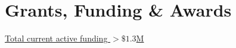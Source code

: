\documentclass[11pt,letterpaper,sans]{moderncv}
\begin{document}
\section{Grants, Funding \& Awards}

\underline{Total current active funding $>\$1.3$M} \vspace{0.25cm}
\end{document}
